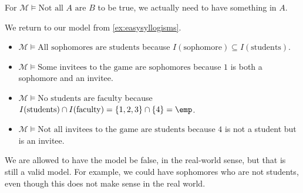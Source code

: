 \begin{remark}
	For $\mathcal M\models\textrm{Not all }A\textrm{ are }B$ to be true, we actually need to have something in $A$.
\end{remark}
\begin{example}
	We return to our model from \autoref{ex:easysyllogisms}.
	\begin{itemize}
		\item $\mathcal M\models\textrm{All sophomores are students}$ because $I(\mathrm{sophomore})\subseteq I(\mathrm{students})$.
		\item $\mathcal M\models\textrm{Some invitees to the game are sophomores}$ because $1$ is both a sophomore and an invitee.
		\item $\mathcal M\models\textrm{No students are faculty}$ because $I(\mathrm{students})\cap I(\mathrm{faculty})=\{1,2,3\}\cap\{4\}=\emp$.
		\item $\mathcal M\models\textrm{Not all invitees to the game are students}$ because $4$ is not a student but is an invitee.
	\end{itemize}
\end{example}
\begin{remark}
	We are allowed to have the model be false, in the real-world sense, but that is still a valid model. For example, we could have sophomores who are not students, even though this does not make sense in the real world.
\end{remark}

